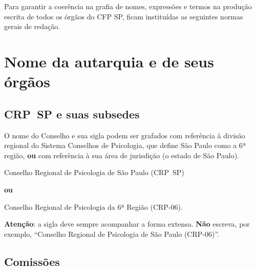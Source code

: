 Para garantir a coerência na grafia de nomes, expressões e termos na
produção escrita de todos os órgãos do CFP SP, ficam instituídas as
seguintes normas gerais de redação.

\section{Nome da autarquia e de seus
  órgãos}

\subsection{CRP~SP e suas subsedes}

O nome do Conselho e sua sigla podem ser grafados com referência à
divisão regional do Sistema Conselhos de Psicologia, que define São
Paulo como a 6ª região, \textbf{ou} com referência à sua área de
jurisdição (o estado de São Paulo).

Conselho Regional de Psicologia de São Paulo (CRP~SP)

\textbf{ou}

Conselho Regional de Psicologia da 6ª Região (CRP-06).

\textbf{Atenção}: a sigla deve sempre acompanhar a forma extensa.
\textbf{Não} escreva, por exemplo, ``Conselho Regional de Psicologia de
São Paulo (CRP-06)''.

\subsection{Comissões}

